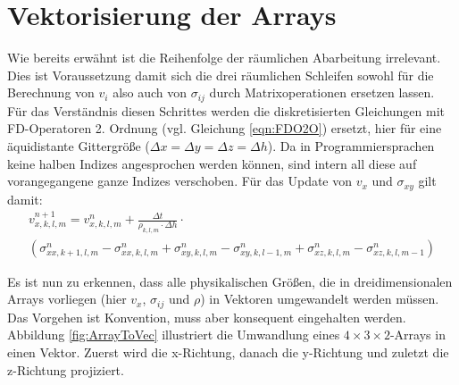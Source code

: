 \documentclass[pdftex,a4paper,parskip,listof=totoc,bibliography=totoc,onehalfspacing,12pt]{scrreprt}
\begin{document}
\section{Vektorisierung der Arrays}
Wie bereits erwähnt ist die Reihenfolge der räumlichen Abarbeitung irrelevant. Dies ist Voraussetzung damit sich die drei räumlichen Schleifen sowohl für die Berechnung von $v_i$ also auch von $\sigma_{ij}$ durch Matrixoperationen ersetzen lassen. Für das Verständnis diesen Schrittes werden die diskretisierten Gleichungen mit FD-Operatoren 2. Ordnung (vgl. Gleichung \ref{eqn:FDO2O}) ersetzt, hier für eine äquidistante Gittergröße ($\Delta x = \Delta y = \Delta z = \Delta h$). Da in Programmiersprachen keine halben Indizes angesprochen werden können, sind intern all diese auf vorangegangene ganze Indizes verschoben. Für das Update von $v_x$ und $\sigma_{xy}$ gilt damit:
\begin{multline}
	v_{x,k,l,m}^{n+1} = v_{x,k,l,m}^n + \frac{\Delta t}{\rho_{k,l,m} \cdot \Delta h} \cdot\\  \left( \sigma_{xx,k+1,l,m}^{n} - \sigma_{xx,k,l,m}^{n} + \sigma_{xy,k,l,m}^{n} - \sigma_{xy,k,l-1,m}^{n} + \sigma_{xz,k,l,m}^{n} - \sigma_{xz,k,l,m-1}^{n} \right)\label{eqn:exMV1}
\end{multline}

Es ist nun zu erkennen, dass alle physikalischen Größen, die in dreidimensionalen Arrays vorliegen (hier $v_x$, $\sigma_{ij}$ und $\rho$) in Vektoren umgewandelt werden müssen. Das Vorgehen ist Konvention, muss aber konsequent eingehalten werden. Abbildung \ref{fig:ArrayToVec} illustriert die Umwandlung eines $4 \times 3 \times 2$-Arrays in einen Vektor. Zuerst wird die x-Richtung, danach die y-Richtung und zuletzt die z-Richtung projiziert.
\end{document}
